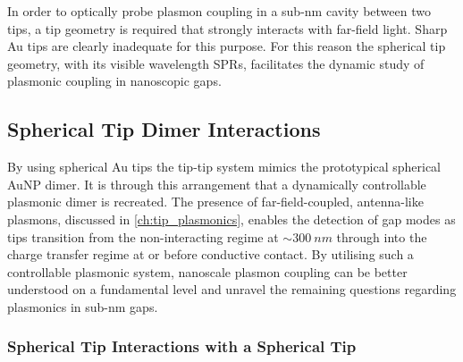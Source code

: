\documentclass[a4paper]{article}
\begin{document}
In order to optically probe plasmon coupling in a sub-nm cavity between two tips, a tip geometry is required that strongly interacts with far-field light. Sharp Au tips are clearly inadequate for this purpose. For this reason the spherical tip geometry, with its visible wavelength SPRs, facilitates the dynamic study of plasmonic coupling in nanoscopic gaps.

\subsection{Spherical Tip Dimer Interactions}

By using spherical Au tips the tip-tip system mimics the prototypical spherical AuNP dimer. It is through this  arrangement that a dynamically controllable plasmonic dimer is recreated. The presence of far-field-coupled, antenna-like plasmons, discussed in \ref{ch:tip_plasmonics}, enables the detection of gap modes as tips transition from the non-interacting regime at $\sim\SI{300}{nm}$ through into the charge transfer regime at or before conductive contact. By utilising such a controllable plasmonic system, nanoscale plasmon coupling can be better understood on a fundamental level and unravel the remaining questions regarding plasmonics in sub-nm gaps.

\subsubsection{Spherical Tip Interactions with a Spherical Tip}
\end{document}
